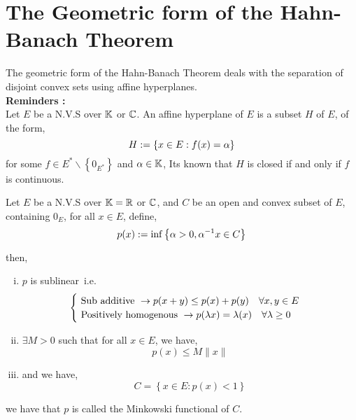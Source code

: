 \section{The Geometric form of the Hahn-Banach Theorem}
The geometric form of the Hahn-Banach Theorem
deals with the separation of disjoint convex sets using  
affine hyperplanes.
\\
\textbf{Reminders : } 
\\
Let $E $ be a N.V.S over $\mathbb{K} $ or $ \mathbb{C} $. An affine
hyperplane of $E $ is a subset $H $ of $E $, of the form, 
\[
H := 
\left\{ 
	x \in  E: 
	f(x) =  \alpha
\right\}
\]
for some $f \in  E^{*} \backslash \left\{ 0_{E^{*}} \right\} $ 
and $\alpha \in  \mathbb{K}$, 
Its known that $H $ is closed if and only if $f $ is 
continuous.
\begin{theorem}[]
Let $E $ be a N.V.S over $\mathbb{K}=\mathbb{R}  $  or $\mathbb{C}  $, 
and $C $ be an open and convex subset of $E$, 
containing $0_{E}$, for all $x \in  E $, define,  
\[
p(x) := 
\inf_{} \left\{ 
	\alpha >  0, 
	\alpha^{-1} x \in  C 
\right\}
\]
then, 
\begin{enumerate}[(i)]
\item $p $ is sublinear i.e.
	\[
		\begin{cases}
		\text{ Sub additive } \rightarrow 
		p(x+y)  \leq  p(x) + p(y)  \quad 
		\forall  x,y \in  E \\
		\text{ Positively homogenous }  \rightarrow 
		p(\lambda x)  = \lambda(x)  \quad \forall \lambda \geq 0
		\end{cases}
	\] 
\item $\exists M > 0 $ such that for all $x \in E $, we have, 
	\[
	p(x) \leq  M \| x \| 
	\]
\item and we have,  
	\[
	C = \left\{ x \in  E: p(x) < 1 \right\} 
	\]
\end{enumerate}
we have that $p $ is called the Minkowski functional of $C$. 
\end{theorem}
